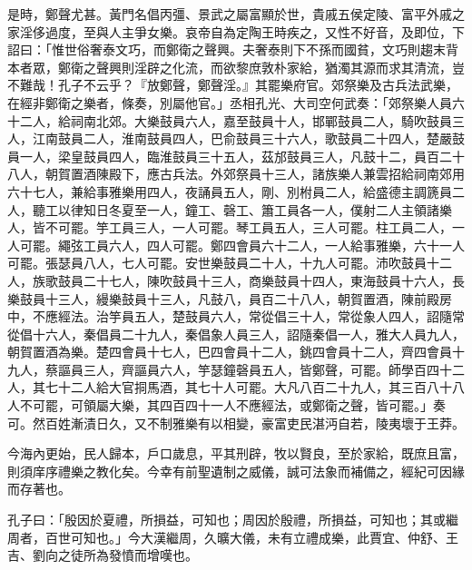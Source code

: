 \begin{pinyinscope}
是時，鄭聲尤甚。黃門名倡丙彊、景武之屬富顯於世，貴戚五侯定陵、富平外戚之家淫侈過度，至與人主爭女樂。哀帝自為定陶王時疾之，又性不好音，及即位，下詔曰：「惟世俗奢泰文巧，而鄭衛之聲興。夫奢泰則下不孫而國貧，文巧則趨末背本者眾，鄭衛之聲興則淫辟之化流，而欲黎庶敦朴家給，猶濁其源而求其清流，豈不難哉！孔子不云乎？『放鄭聲，鄭聲淫。』其罷樂府官。郊祭樂及古兵法武樂，在經非鄭衛之樂者，條奏，別屬他官。」丞相孔光、大司空何武奏：「郊祭樂人員六十二人，給祠南北郊。大樂鼓員六人，嘉至鼓員十人，邯鄲鼓員二人，騎吹鼓員三人，江南鼓員二人，淮南鼓員四人，巴俞鼓員三十六人，歌鼓員二十四人，楚嚴鼓員一人，梁皇鼓員四人，臨淮鼓員三十五人，茲邡鼓員三人，凡鼓十二，員百二十八人，朝賀置酒陳殿下，應古兵法。外郊祭員十三人，諸族樂人兼雲招給祠南郊用六十七人，兼給事雅樂用四人，夜誦員五人，剛、別柎員二人，給盛德主調篪員二人，聽工以律知日冬夏至一人，鐘工、磬工、簫工員各一人，僕射二人主領諸樂人，皆不可罷。竽工員三人，一人可罷。琴工員五人，三人可罷。柱工員二人，一人可罷。繩弦工員六人，四人可罷。鄭四會員六十二人，一人給事雅樂，六十一人可罷。張瑟員八人，七人可罷。安世樂鼓員二十人，十九人可罷。沛吹鼓員十二人，族歌鼓員二十七人，陳吹鼓員十三人，商樂鼓員十四人，東海鼓員十六人，長樂鼓員十三人，縵樂鼓員十三人，凡鼓八，員百二十八人，朝賀置酒，陳前殿房中，不應經法。治竽員五人，楚鼓員六人，常從倡三十人，常從象人四人，詔隨常從倡十六人，秦倡員二十九人，秦倡象人員三人，詔隨秦倡一人，雅大人員九人，朝賀置酒為樂。楚四會員十七人，巴四會員十二人，銚四會員十二人，齊四會員十九人，蔡謳員三人，齊謳員六人，竽瑟鐘磬員五人，皆鄭聲，可罷。師學百四十二人，其七十二人給大官挏馬酒，其七十人可罷。大凡八百二十九人，其三百八十八人不可罷，可領屬大樂，其四百四十一人不應經法，或鄭衛之聲，皆可罷。」奏可。然百姓漸漬日久，又不制雅樂有以相變，豪富吏民湛沔自若，陵夷壞于王莽。

今海內更始，民人歸本，戶口歲息，平其刑辟，牧以賢良，至於家給，既庶且富，則須庠序禮樂之教化矣。今幸有前聖遺制之威儀，誠可法象而補備之，經紀可因緣而存著也。

孔子曰：「殷因於夏禮，所損益，可知也；周因於殷禮，所損益，可知也；其或繼周者，百世可知也。」今大漢繼周，久曠大儀，未有立禮成樂，此賈宜、仲舒、王吉、劉向之徒所為發憤而增嘆也。


\end{pinyinscope}